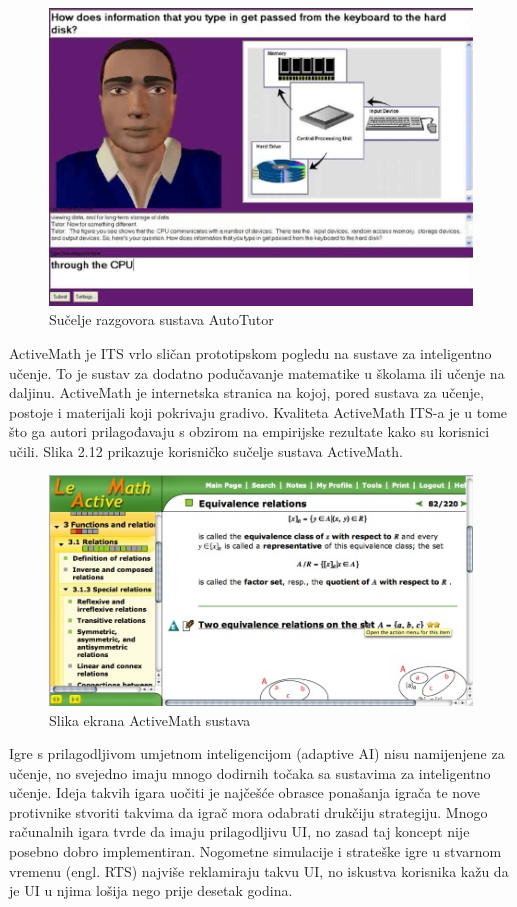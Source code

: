 \documentclass[times, utf8, zavrsni, numeric]{fer}
\begin{document}
\begin{figure}[htb]
	\centering
	\includegraphics[]{img/autotutor.jpg}
	\caption{Sučelje razgovora sustava AutoTutor\citep{autotutorpic}}
	\label{fig:autotutor}
\end{figure}

\par
ActiveMath je ITS vrlo sličan prototipskom pogledu na sustave za inteligentno učenje. To je sustav za dodatno podučavanje matematike u školama ili učenje na daljinu. ActiveMath je internetska stranica na kojoj, pored sustava za učenje, postoje i materijali koji pokrivaju gradivo. Kvaliteta ActiveMath ITS-a je u tome što ga autori prilagođavaju s obzirom na empirijske rezultate kako su korisnici učili.\citep{activemath} Slika 2.12 prikazuje korisničko sučelje sustava ActiveMath.

\begin{figure}[htb]
	\centering
	\includegraphics[]{img/activemath.jpg}
	\caption{Slika ekrana ActiveMath sustava\citep{activemathpic}}
	\label{fig:activemath}
\end{figure}


\par
Igre s prilagodljivom umjetnom inteligencijom (adaptive AI) nisu namijenjene za učenje, no svejedno imaju mnogo dodirnih točaka sa sustavima za inteligentno učenje. Ideja takvih igara uočiti je najčešće obrasce ponašanja igrača te nove protivnike stvoriti takvima da igrač mora odabrati drukčiju strategiju. Mnogo računalnih igara tvrde da imaju prilagodljivu UI, no zasad taj koncept nije posebno dobro implementiran. Nogometne simulacije i strateške igre u stvarnom vremenu (engl. RTS) najviše reklamiraju takvu UI, no iskustva korisnika kažu da je UI u njima lošija nego prije desetak godina.\citep{adaptiveai}
\end{document}
